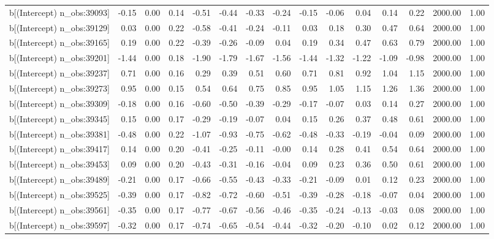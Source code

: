 \begin{table}[ht]
\begin{tabular}{rrrrrrrrrrrrrrr}
  b[(Intercept) n\_obs:39093] & -0.15 & 0.00 & 0.14 & -0.51 & -0.44 & -0.33 & -0.24 & -0.15 & -0.06 & 0.04 & 0.14 & 0.22 & 2000.00 & 1.00 \\ 
  b[(Intercept) n\_obs:39129] & 0.03 & 0.00 & 0.22 & -0.58 & -0.41 & -0.24 & -0.11 & 0.03 & 0.18 & 0.30 & 0.47 & 0.64 & 2000.00 & 1.00 \\ 
  b[(Intercept) n\_obs:39165] & 0.19 & 0.00 & 0.22 & -0.39 & -0.26 & -0.09 & 0.04 & 0.19 & 0.34 & 0.47 & 0.63 & 0.79 & 2000.00 & 1.00 \\ 
  b[(Intercept) n\_obs:39201] & -1.44 & 0.00 & 0.18 & -1.90 & -1.79 & -1.67 & -1.56 & -1.44 & -1.32 & -1.22 & -1.09 & -0.98 & 2000.00 & 1.00 \\ 
  b[(Intercept) n\_obs:39237] & 0.71 & 0.00 & 0.16 & 0.29 & 0.39 & 0.51 & 0.60 & 0.71 & 0.81 & 0.92 & 1.04 & 1.15 & 2000.00 & 1.00 \\ 
  b[(Intercept) n\_obs:39273] & 0.95 & 0.00 & 0.15 & 0.54 & 0.64 & 0.75 & 0.85 & 0.95 & 1.05 & 1.15 & 1.26 & 1.36 & 2000.00 & 1.00 \\ 
  b[(Intercept) n\_obs:39309] & -0.18 & 0.00 & 0.16 & -0.60 & -0.50 & -0.39 & -0.29 & -0.17 & -0.07 & 0.03 & 0.14 & 0.27 & 2000.00 & 1.00 \\ 
  b[(Intercept) n\_obs:39345] & 0.15 & 0.00 & 0.17 & -0.29 & -0.19 & -0.07 & 0.04 & 0.15 & 0.26 & 0.37 & 0.48 & 0.61 & 2000.00 & 1.00 \\ 
  b[(Intercept) n\_obs:39381] & -0.48 & 0.00 & 0.22 & -1.07 & -0.93 & -0.75 & -0.62 & -0.48 & -0.33 & -0.19 & -0.04 & 0.09 & 2000.00 & 1.00 \\ 
  b[(Intercept) n\_obs:39417] & 0.14 & 0.00 & 0.20 & -0.41 & -0.25 & -0.11 & -0.00 & 0.14 & 0.28 & 0.41 & 0.54 & 0.64 & 2000.00 & 1.00 \\ 
  b[(Intercept) n\_obs:39453] & 0.09 & 0.00 & 0.20 & -0.43 & -0.31 & -0.16 & -0.04 & 0.09 & 0.23 & 0.36 & 0.50 & 0.61 & 2000.00 & 1.00 \\ 
  b[(Intercept) n\_obs:39489] & -0.21 & 0.00 & 0.17 & -0.66 & -0.55 & -0.43 & -0.33 & -0.21 & -0.09 & 0.01 & 0.12 & 0.23 & 2000.00 & 1.00 \\ 
  b[(Intercept) n\_obs:39525] & -0.39 & 0.00 & 0.17 & -0.82 & -0.72 & -0.60 & -0.51 & -0.39 & -0.28 & -0.18 & -0.07 & 0.04 & 2000.00 & 1.00 \\ 
  b[(Intercept) n\_obs:39561] & -0.35 & 0.00 & 0.17 & -0.77 & -0.67 & -0.56 & -0.46 & -0.35 & -0.24 & -0.13 & -0.03 & 0.08 & 2000.00 & 1.00 \\ 
  b[(Intercept) n\_obs:39597] & -0.32 & 0.00 & 0.17 & -0.74 & -0.65 & -0.54 & -0.44 & -0.32 & -0.20 & -0.10 & 0.02 & 0.12 & 2000.00 & 1.00 \\ 

\end{tabular}
\end{table}
